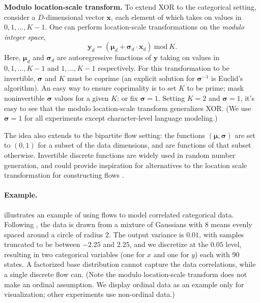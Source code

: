 \documentclass{article}
\newcommand{\mathbold}[1]{\ensuremath{\boldsymbol{\mathbf{#1}}}}
\newcommand{\nestedmathbold}[1]{{\mathbold{#1}}}
\newcommand{\mbx}{\nestedmathbold{x}}
\newcommand{\mby}{\nestedmathbold{y}}
\newcommand{\mbmu}{\nestedmathbold{\mu}}
\newcommand{\mbsigma}{\nestedmathbold{\sigma}}
\begin{document}
\textbf{Modulo location-scale transform.}
To extend XOR to the categorical setting,
consider a $D$-dimensional vector $\mbx$, each element of which takes on values in $0, 1, \dots, K-1$. One can perform location-scale transformations on the \emph{modulo integer space},
\begin{equation}\label{eq:loc-scale}
\mby_d = (\mbmu_d + \mbsigma_d \cdot \mbx_d)\  \text{mod} \  K.
\end{equation}
Here, $\mbmu_d$ and $\mbsigma_d$ are autoregressive functions of $\mby$ taking on values in $0,1,\dots,K-1$ and $1,\dots,K-1$ respectively. For this transformation to be invertible, $\mbsigma$ and $K$ must be coprime (an explicit solution for $\mbsigma^{-1}$ is Euclid's algorithm). An easy way to ensure coprimality is to set $K$ to be prime; mask noninvertible $\mbsigma$ values for a given $K$; or fix $\mbsigma=1$. Setting $K=2$ and $\mbsigma=1$, it's easy to see that the modulo location-scale transform generalizes XOR. (We use $\mbsigma=1$ for all experiments except character-level language modeling.)

The idea also extends to the bipartite flow setting: the functions $(\mbmu,\mbsigma)$ are set to $(0,1)$ for a subset of the data dimensions, and are functions of that subset otherwise. Invertible discrete functions are widely used in random number generation, and could provide inspiration for alternatives to the location scale transformation for constructing flows \citep{salmon2011parallel}.



\paragraph{Example.}
 illustrates an example of using flows to model correlated categorical data. Following \citet{metz2016unrolled}, the data is drawn from a mixture of Gaussians with 8 means evenly spaced around a circle of radius 2. The output variance is $0.01$, with samples truncated to be between $-2.25$ and $2.25$, and we discretize at the $0.05$ level, resulting in two categorical variables (one for $x$ and one for $y$) each with 90 states. A factorized base distribution cannot capture the data correlations, while a single discrete flow can. (Note the modulo location-scale transform does not make an ordinal assumption. We display ordinal data as an example only for visualization; other experiments use non-ordinal data.)
\end{document}
